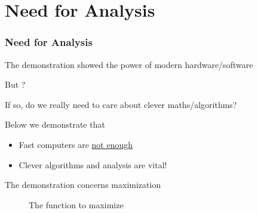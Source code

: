 \section{Need for Analysis}

\begin{frame}
    \frametitle{Need for Analysis}

    The demonstration showed the power of modern hardware/software

    \vspace{1em}

    But ?

    \vspace{0.5em}
    If so, do we really need to care about clever maths/algorithms?

    \vspace{0.5em}
    Below we demonstrate that
    \begin{itemize}
        \item Fast computers are \underline{not enough}
        \vspace{0.5em}
        \item Clever algorithms and analysis are vital!
    \end{itemize}

    The demonstration concerns  maximization

\end{frame}




\begin{frame}
    
    \begin{figure}
       \begin{center}
           \caption{The function to maximize}
       \end{center}
    \end{figure}

\end{frame}



